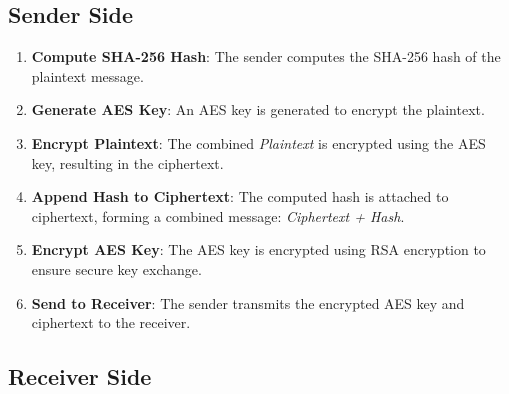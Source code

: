 \documentclass{article}
\begin{document}
\subsection{Sender Side}

\begin{enumerate}
    \item \textbf{Compute SHA-256 Hash}: 
    The sender computes the SHA-256 hash of the plaintext message.

    \item \textbf{Generate AES Key}:
    An AES key is generated to encrypt the plaintext.

    \item \textbf{Encrypt Plaintext}:
    The combined \textit{Plaintext} is encrypted using the AES key, resulting in the ciphertext.

    \item \textbf{Append Hash to Ciphertext}:
    The computed hash is attached to ciphertext, forming a combined message: \textit{Ciphertext + Hash}.

    \item \textbf{Encrypt AES Key}:
    The AES key is encrypted using RSA encryption to ensure secure key exchange.

    \item \textbf{Send to Receiver}:
    The sender transmits the encrypted AES key and ciphertext to the receiver.
\end{enumerate}

\subsection*{Receiver Side}
\end{document}
